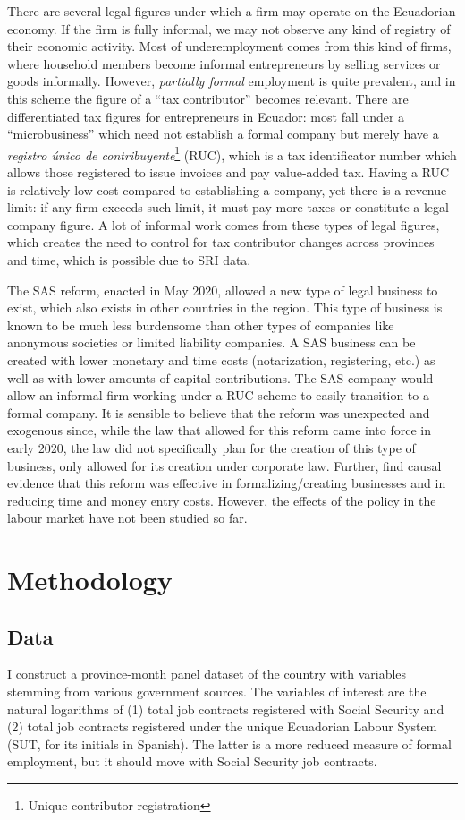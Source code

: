 \documentclass[11pt,a4paper]{article}\usepackage[]{graphicx}\usepackage[]{xcolor}
\begin{document}
There are several legal figures under which a firm may operate on the Ecuadorian economy. If the firm is fully informal, we may not observe any kind of registry of their economic activity. Most of underemployment comes from this kind of firms, where household members become informal entrepreneurs by selling services or goods informally. However, \textit{partially formal} employment is quite prevalent, and in this scheme the figure of a ``tax contributor'' becomes relevant. There are differentiated tax figures for entrepreneurs in Ecuador: most fall under a ``microbusiness'' which need not establish a formal company but merely have a \textit{registro único de contribuyente}\footnote{Unique contributor registration} (RUC), which is a tax identificator number which allows those registered to issue invoices and pay value-added tax. Having a RUC is relatively low cost compared to establishing a company, yet there is a revenue limit: if any firm exceeds such limit, it must pay more taxes or constitute a legal company figure. A lot of informal work comes from these types of legal figures, which creates the need to control for tax contributor changes across provinces and time, which is possible due to SRI data.

The SAS reform, enacted in May 2020, allowed a new type of legal business to exist, which also exists in other countries in the region. This type of business is known to be much less burdensome than other types of companies like anonymous societies or limited liability companies. A SAS business can be created with lower monetary and time costs (notarization, registering, etc.) as well as with lower amounts of capital contributions. The SAS company would allow an informal firm working under a RUC scheme to easily transition to a formal company. It is sensible to believe that the reform was unexpected and exogenous since, while the law that allowed for this reform came into force in early 2020, the law did not specifically plan for the creation of this type of business, only allowed for its creation under corporate law. Further, \textcite{CaminoMogro.2022} find causal evidence that this reform was effective in formalizing/creating businesses and in reducing time and money entry costs. However, the effects of the policy in the labour market have not been studied so far. 

\section{Methodology}
\subsection{Data}
I construct a province-month panel dataset of the country with variables stemming from various government sources. The variables of interest are the natural logarithms of (1) total job contracts registered with Social Security and (2) total job contracts registered under the unique Ecuadorian Labour System (SUT, for its initials in Spanish). The latter is a more reduced measure of formal employment, but it should move with Social Security job contracts.
\end{document}
